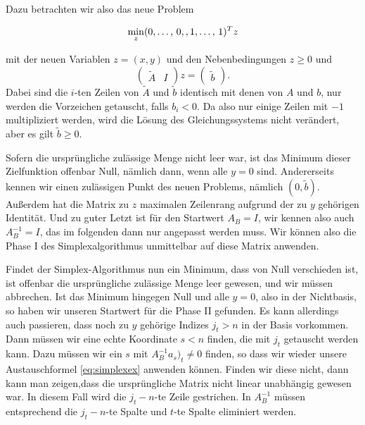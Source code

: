 Dazu betrachten wir also das neue Problem
{\samepage\vspace{0.2em}\begin{equation}
  \min_z (\tikzlabel{xl}0,\ldots,\,0,\tikzlabel{xr},
  \tikzlabel{yl}1,\ldots,\,1\tikzlabel{yr})^Tz
\end{equation}
}
mit der neuen Variablen $z=(x,y)$ und den Nebenbedingungen $z\ge 0$
und
\begin{equation*}
  \begin{pmatrix}
    \tilde{A} & I 
  \end{pmatrix}
  z =
  \begin{pmatrix}
    \tilde{b}
  \end{pmatrix}.
\end{equation*}
Dabei sind die $i$-ten Zeilen von $\tilde{A}$ und $\tilde{b}$
identisch mit denen von $A$ und $b$, nur werden die Vorzeichen
getauscht, falls $b_i<0$. Da also nur einige Zeilen mit $-1$
multipliziert werden, wird die Lösung des Gleichungssystems nicht
verändert, aber es gilt $\tilde{b}\ge 0$.

Sofern die ursprüngliche zulässige Menge nicht leer war, ist das
Minimum dieser Zielfunktion offenbar Null, nämlich dann, wenn alle
$y=0$ sind. Andererseits kennen wir einen zulässigen Punkt des neuen
Problems, nämlich $(0,\tilde{b})$. Außerdem hat die Matrix zu $z$
maximalen Zeilenrang aufgrund der zu $y$ gehörigen Identität. Und zu
guter Letzt ist für den Startwert $A_B=I$, wir kennen also auch
$A_B^{-1}=I$, das im folgenden dann nur angepasst werden muss. Wir
können also die Phase I des Simplexalgorithmus unmittelbar auf diese
Matrix anwenden.

Findet der Simplex-Algorithmus nun ein Minimum, dass von Null
verschieden ist, ist offenbar die ursprüngliche zulässige Menge leer
gewesen, und wir müssen abbrechen. Ist das Minimum hingegen Null und
alle $y=0$, also in der Nichtbasis, so haben wir unseren Startwert für
die Phase II gefunden. Es kann allerdings auch passieren, dass noch zu
$y$ gehörige Indizes $j_t>n$ in der Basis vorkommen. Dann müssen wir
eine echte Koordinate $s<n$ finden, die mit $j_t$ getauscht werden
kann. Dazu müssen wir ein $s$ mit $A_B^{-1}a_s)_t\neq 0$ finden, so
dass wir wieder unsere Austauschformel \eqref{eq:simplexex} anwenden
können. Finden wir diese nicht, dann kann man zeigen,dass die
ursprüngliche Matrix nicht linear unabhängig gewesen war. In diesem
Fall wird die $j_t-n$-te Zeile gestrichen. In $A_B^{-1}$ müssen
entsprechend die $j_t-n$-te Spalte und $t$-te Spalte eliminiert
werden.

